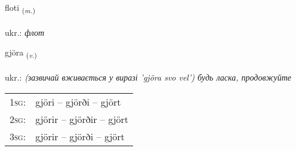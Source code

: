 \documentclass[frontgrid, backgrid]{flacards}\usepackage[]{graphicx}\usepackage[]{xcolor}
\begin{document}
\renewcommand{\flhead}{\vskip5pt \fboxsep=0pt {\small\bfseries\footnotesize Nafnorð | іменник}}
\renewcommand{\fcfoot}{\vskip5pt \fboxsep=0pt \hspace{2pt}{\small\bfseries\footnotesize 3K}}

\renewcommand{\blhead}{\vskip5pt {\small\bfseries\footnotesize Nafnorð | іменник }}
\renewcommand{\bcfoot}{\vskip5pt \hspace{2pt}{\small\bfseries\footnotesize 3K}}


{floti \small{\textsubscript{(\textit{m.})}} \\[1ex] %
\textphonetic{[flɔːtɪ]} \\
ukr.: \emph{флот} \\  [2ex]
\renewcommand*{\arraystretch}{0.8}
}

\renewcommand{\flhead}{\vskip5pt \fboxsep=0pt {\small\bfseries\footnotesize Sagnorð | дієслово}}
\renewcommand{\fcfoot}{\vskip5pt \fboxsep=0pt \hspace{2pt}{\small\bfseries\footnotesize 3K}}

\renewcommand{\blhead}{\vskip5pt {\small\bfseries\footnotesize Sagnorð | дієслово }}
\renewcommand{\bcfoot}{\vskip5pt \hspace{2pt}{\small\bfseries\footnotesize 3K}}


{gjöra \small{\textsubscript{(\textit{v.})}} \\[1ex] %
\textphonetic{[cœːra]} \\
ukr.: \emph{(зазвичай вживається у виразі 'gjöra svo vel') будь ласка, продовжуйте} \\  [2ex]
\renewcommand*{\arraystretch}{0.8}
\begin{tabular}{p{1cm}l}
\textsc{1sg}: & gjöri -- gjörði -- gjört \\ 
\textsc{2sg}: & gjörir -- gjörðir -- gjört \\ 
\textsc{3sg}: & gjörir -- gjörði -- gjört \\ 
\end{tabular}
}
\end{document}
